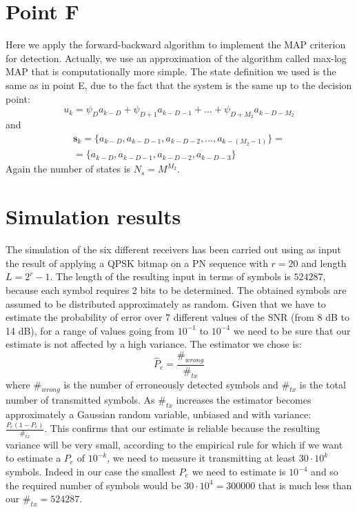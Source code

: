 \documentclass[a4paper,11.5pt]{article}
\newcommand{\vt}{\boldsymbol}
\begin{document}
\section*{Point F}

Here we apply the forward-backward algorithm to implement the MAP criterion for detection. Actually, we use an approximation of the algorithm called max-log MAP that is computationally more simple. The state definition we used is the same as in point E, due to the fact that the system is the same up to the decision point:
\begin{equation}
u_k=\psi_D a_{k-D} + \psi_{D+1} a_{k-D-1} + \dots +\psi_{D+M_2} a_{k-D-M_2}
\end{equation}
and
\begin{equation}
\begin{split}
\vt{s}_k = \{a_{k-D}, a_{k-D-1}, a_{k-D-2}, \dots, a_{k-(M_2-1)}\} = \\
= \{a_{k-D}, a_{k-D-1}, a_{k-D-2}, a_{k-D-3}\}
\end{split}
\end{equation}
Again the number of states is $N_s=M^{M_2}$.




\section*{Simulation results}

The simulation of the six different receivers has been carried out using as input the result of applying a QPSK bitmap on a PN sequence with $r=20$ and length $L=2^r-1$. The length of the resulting input in terms of symbols is $524287$, because each symbol requires 2 bits to be determined. The obtained symbols are assumed to be distributed approximately as random. Given that we have to estimate the probability of error over 7 different values of the SNR (from 8 dB to 14 dB), for a range of values going from $10^{-1}$ to $10^{-4}$ we need to be sure that our estimate is not affected by a high variance. The estimator we chose is:
\begin{equation}
\hat{P}_e = \frac{\#_{wrong}}{\#_{tx}}
\end{equation}
where $\#_{wrong}$ is the number of erroneously detected symbols and $\#_{tx}$ is the total number of transmitted symbols. As $\#_{tx}$ increases the estimator becomes approximately a Gaussian random variable, unbiased and with variance: $\frac{P_e (1-P_e)}{\#_{tx}}$. This confirms that our estimate is reliable because the resulting variance will be very small, according to the empirical rule for which if we want to estimate a $P_e$ of $10^{-k}$, we need to measure it transmitting at least $30\cdot 10^{k}$ symbols. Indeed in our case the smallest $P_e$ we need to estimate is $10^{-4}$ and so the required number of symbols would be $30\cdot 10^{4}= 300000$ that is much less than our $\#_{tx}=524287$.
\end{document}
